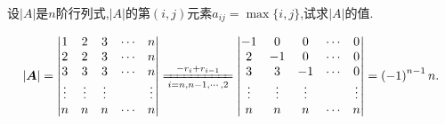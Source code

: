 \documentclass[../../main.tex]{subfiles}%
\begin{document}
\begin{example}
设\(\vert A\vert\)是\(n\)阶行列式,\(\vert A\vert\)的第\((i,j)\)元素\(a_{ij}=\max\{i,j\}\),试求\(\vert A\vert\)的值.
\end{example}
\begin{solution}
\begin{align*}
\left| \boldsymbol{A} \right|=\left| \begin{matrix}
1&		2&		3&		\cdots&		n\\
2&		2&		3&		\cdots&		n\\
3&		3&		3&		\cdots&		n\\
\vdots&		\vdots&		\vdots&		&		\vdots\\
n&		n&		n&		\cdots&		n\\
\end{matrix} \right|\xlongequal[i=n,n-1,\cdots ,2]{-r_i+r_{i-1}}\left| \begin{matrix}
-1&		0&		0&		\cdots&		0\\
2&		-1&		0&		\cdots&		0\\
3&		3&		-1&		\cdots&		0\\
\vdots&		\vdots&		\vdots&		&		\vdots\\
n&		n&		n&		\cdots&		n\\
\end{matrix} \right|=\left( -1 \right) ^{n-1}n.
\end{align*}

\end{solution}
\end{document}
